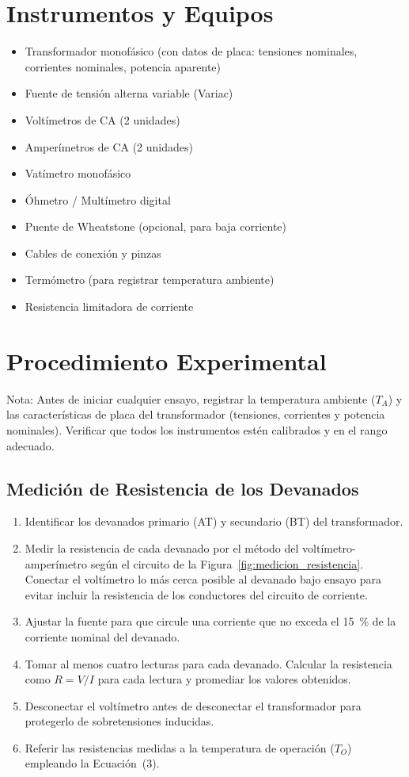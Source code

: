 \section{Instrumentos y Equipos}
\begin{itemize}
    \item Transformador monofásico (con datos de placa: tensiones nominales, corrientes nominales, potencia aparente)
    \item Fuente de tensión alterna variable (Variac)
    \item Voltímetros de CA (2 unidades)
    \item Amperímetros de CA (2 unidades)
    \item Vatímetro monofásico
    \item Óhmetro / Multímetro digital
    \item Puente de Wheatstone (opcional, para baja corriente)
    \item Cables de conexión y pinzas
    \item Termómetro (para registrar temperatura ambiente)
    \item Resistencia limitadora de corriente
\end{itemize}

\section{Procedimiento Experimental}

Nota: Antes de iniciar cualquier ensayo, registrar la temperatura ambiente ($T_A$) y las características de placa del transformador (tensiones, corrientes y potencia nominales). Verificar que todos los instrumentos estén calibrados y en el rango adecuado.

\subsection{Medición de Resistencia de los Devanados}

\begin{enumerate}
    \item Identificar los devanados primario (AT) y secundario (BT) del transformador.
    \item Medir la resistencia de cada devanado por el método del voltímetro-amperímetro según el circuito de la Figura~\ref{fig:medicion_resistencia}. Conectar el voltímetro lo más cerca posible al devanado bajo ensayo para evitar incluir la resistencia de los conductores del circuito de corriente.
    \item Ajustar la fuente para que circule una corriente que no exceda el 15~\% de la corriente nominal del devanado.
    \item Tomar al menos cuatro lecturas para cada devanado. Calcular la resistencia como $R = V/I$ para cada lectura y promediar los valores obtenidos.
    \item Desconectar el voltímetro antes de desconectar el transformador para protegerlo de sobretensiones inducidas.
    \item Referir las resistencias medidas a la temperatura de operación ($T_O$) empleando la Ecuación~(3).
\end{enumerate}

